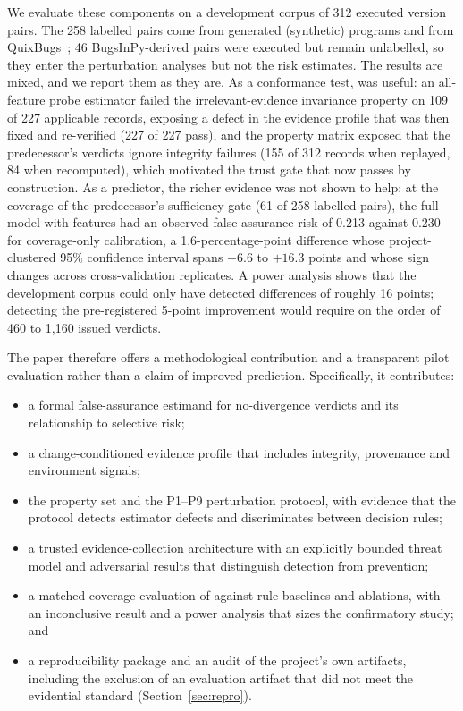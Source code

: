 We evaluate these components on a development corpus of 312 executed version pairs. The 258 labelled pairs come from generated (synthetic) programs and from QuixBugs~\cite{lin2017quixbugs}; 46 BugsInPy-derived pairs were executed but remain unlabelled, so they enter the perturbation analyses but not the risk estimates. The results are mixed, and we report them as they are. As a conformance test, \ers{} was useful: an all-feature probe estimator failed the irrelevant-evidence invariance property on 109 of 227 applicable records, exposing a defect in the evidence profile that was then fixed and re-verified (227 of 227 pass), and the property matrix exposed that the predecessor's verdicts ignore integrity failures (155 of 312 records when replayed, 84 when recomputed), which motivated the \sbg{} trust gate that now passes by construction. As a predictor, the richer evidence was not shown to help: at the coverage of the predecessor's sufficiency gate (61 of 258 labelled pairs), the full \cec{} model with \ers{} features had an observed false-assurance risk of 0.213 against 0.230 for coverage-only calibration, a 1.6-percentage-point difference whose project-clustered 95\% confidence interval spans $-6.6$ to $+16.3$ points and whose sign changes across cross-validation replicates. A power analysis shows that the development corpus could only have detected differences of roughly 16 points; detecting the pre-registered 5-point improvement would require on the order of 460 to 1{,}160 issued \NDO{} verdicts.

The paper therefore offers a methodological contribution and a transparent pilot evaluation rather than a claim of improved prediction. Specifically, it contributes:
\begin{itemize}
\item[C1)] a formal false-assurance estimand for no-divergence verdicts and its relationship to selective risk;
\item[C2)] a change-conditioned evidence profile that includes integrity, provenance and environment signals;
\item[C3)] the \ers{} property set and the P1--P9 perturbation protocol, with evidence that the protocol detects estimator defects and discriminates between decision rules;
\item[C4)] a trusted evidence-collection architecture with an explicitly bounded threat model and adversarial results that distinguish detection from prevention;
\item[C5)] a matched-coverage evaluation of \cec{} against rule baselines and ablations, with an inconclusive result and a power analysis that sizes the confirmatory study; and
\item[C6)] a reproducibility package and an audit of the project's own artifacts, including the exclusion of an evaluation artifact that did not meet the evidential standard (Section~\ref{sec:repro}).
\end{itemize}

